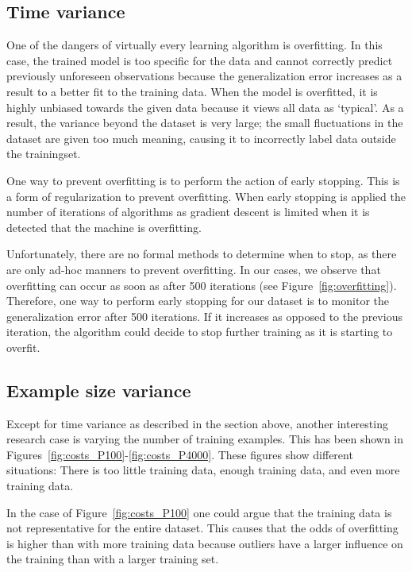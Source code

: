 \subsection{Time variance}
One of the dangers of virtually every learning algorithm is overfitting. 
In this case, the trained model is too specific for the data and cannot correctly predict previously unforeseen observations because the generalization error increases as a result to a better fit to the training data. 
When the model is overfitted, it is highly unbiased towards the given data because it views all data as `typical'.
As a result, the variance beyond the dataset is very large; the small fluctuations in the dataset are given too much meaning, causing it to incorrectly label data outside the trainingset.

One way to prevent overfitting is to perform the action of early stopping. 
This is a form of regularization to prevent overfitting. 
When early stopping is applied the number of iterations of algorithms as gradient descent is limited when it is detected that the machine is overfitting. 

Unfortunately, there are no formal methods to determine when to stop, as there are only ad-hoc manners to prevent overfitting. 
In our cases, we observe that overfitting can occur as soon as after 500 iterations (see Figure~\ref{fig:overfitting}). 
Therefore, one way to perform early stopping for our dataset is to monitor the generalization error after 500 iterations.
If it increases as opposed to the previous iteration, the algorithm could decide to stop further training as it is starting to overfit.

\subsection{Example size variance}
Except for time variance as described in the section above, another interesting research case is varying the number of training examples. 
This has been shown in Figures~\ref{fig:costs_P100}-\ref{fig:costs_P4000}.
These figures show different situations: There is too little training data, enough training data, and even more training data. 

In the case of Figure~\ref{fig:costs_P100} one could argue that the training data is not representative for the entire dataset. 
This causes that the odds of overfitting is higher than with more training data because outliers have a larger influence on the training than with a larger training set.


